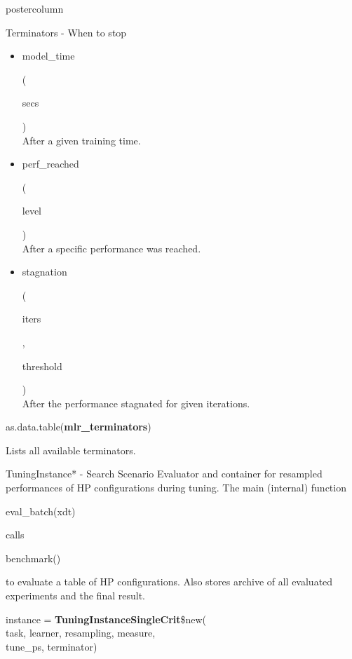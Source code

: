 \documentclass{beamer}
\newcommand{\codeinline}[1]{\begin{codeboxinline}#1\end{codeboxinline}}
\begin{document}
\begin{frame}[fragile]{}
\begin{columns}
\begin{column}{.245\textwidth}
\begin{beamercolorbox}[center]{postercolumn}
\begin{minipage}{.98\textwidth}
{\begin{myblock}{Terminators - When to stop}
\begin{itemize}
								      (\codeinline{secs}, \codeinline{stop\_time})\\
								      After a given absolute time.
								\item \codeinline{model\_time}
								      (\codeinline{secs })\\
								      After a given training time.
								\item \codeinline{perf\_reached}
								      (\codeinline{level})\\
								      After a specific performance was reached.
								\item \codeinline{stagnation}
								      (\codeinline{iters}, \codeinline{threshold})\\
								      After the performance stagnated for given iterations.
							\end{itemize}
							\vspace{1em}
							\begin{codebox}
								as.data.table(\textbf{mlr\_terminators})
							\end{codebox}
							Lists all available terminators.
						\end{myblock}
						\begin{myblock}{TuningInstance* - Search Scenario}
							Evaluator and container for resampled performances of HP configurations during tuning.
							The main (internal) function \codeinline{eval\_batch(xdt)} calls \codeinline{benchmark()} to evaluate a table of HP configurations.
							Also stores archive of all evaluated experiments and the final result.
							\\
							\begin{codeboxmultiline}[width=25cm]
								instance = \textbf{TuningInstanceSingleCrit}\$new(\\
								\hspace*{1ex}task, learner, resampling, measure,\\
								\hspace*{1ex}tune\_ps, terminator)
							\end{codeboxmultiline}

\end{myblock}}
\end{minipage}
\end{beamercolorbox}
\end{column}
\end{columns}
\end{frame}
\end{document}
